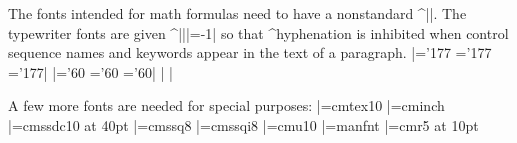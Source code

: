 The fonts intended for math formulas need to have a nonstandard ^|\skewchar|.
The typewriter fonts are given ^|\hyphenchar||=-1| so that ^{hyphenation}
is inhibited when control sequence names and keywords appear in the text
of a paragraph.
\beginlines
|\skewchar\ninei='177  \skewchar\eighti='177  \skewchar\sixi='177|
|\skewchar\ninesy='60  \skewchar\eightsy='60  \skewchar\sixsy='60|
|\hyphenchar{} \hyphenchar{} \hyphenchar{}|
\endlines

A few more fonts are needed for special purposes:
\beginlines
|\font\tentex=cmtex10               %
|\font\inchhigh=cminch              %
|\font\titlefont=cmssdc10 at 40pt   %
|\font\eightss=cmssq8               %
|\font\eightssi=cmssqi8             %
|\font\tenu=cmu10                   %
|\font\manual=manfnt                %
|\font\magnifiedfiverm=cmr5 at 10pt %
\endlines


